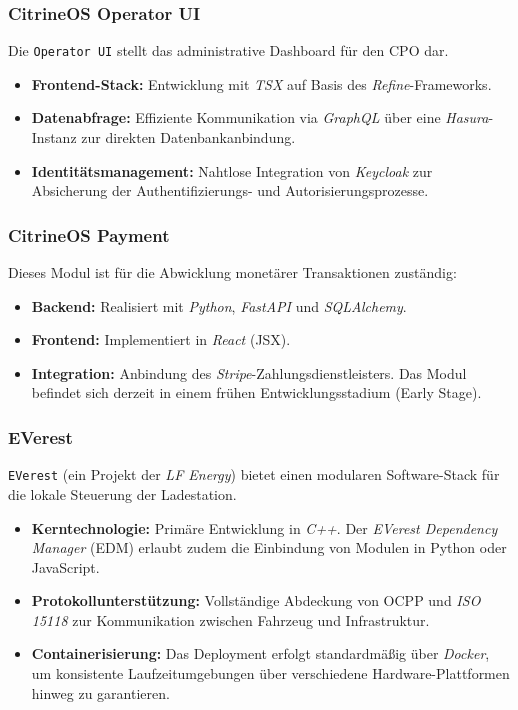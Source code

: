\documentclass[12pt,a4paper]{report}
\begin{document}
\subsubsection{CitrineOS Operator UI}
Die \texttt{Operator UI} stellt das administrative Dashboard für den \gls{CPO} dar.
\begin{itemize}
    \item \textbf{Frontend-Stack:} Entwicklung mit \textit{TSX} auf Basis des \textit{Refine}-Frameworks.
    \item \textbf{Datenabfrage:} Effiziente Kommunikation via \textit{GraphQL} über eine \textit{Hasura}-Instanz zur direkten Datenbankanbindung.
    \item \textbf{Identitätsmanagement:} Nahtlose Integration von \textit{Keycloak} zur Absicherung der Authentifizierungs- und Autorisierungsprozesse.
\end{itemize}



\subsubsection{CitrineOS Payment}
Dieses Modul ist für die Abwicklung monetärer Transaktionen zuständig:
\begin{itemize}
    \item \textbf{Backend:} Realisiert mit \textit{Python}, \textit{FastAPI} und \textit{SQLAlchemy}.
    \item \textbf{Frontend:} Implementiert in \textit{React} (JSX).
    \item \textbf{Integration:} Anbindung des \textit{Stripe}-Zahlungsdienstleisters. Das Modul befindet sich derzeit in einem frühen Entwicklungsstadium (Early Stage).
\end{itemize}

\subsubsection{EVerest}
\texttt{EVerest} (ein Projekt der \textit{LF Energy}) bietet einen modularen Software-Stack für die lokale Steuerung der Ladestation.
\begin{itemize}
    \item \textbf{Kerntechnologie:} Primäre Entwicklung in \textit{C++}. Der \textit{EVerest Dependency Manager} (EDM) erlaubt zudem die Einbindung von Modulen in Python oder JavaScript.
    \item \textbf{Protokollunterstützung:} Vollständige Abdeckung von \gls{OCPP} und \textit{ISO 15118} zur Kommunikation zwischen Fahrzeug und Infrastruktur.
    \item \textbf{Containerisierung:} Das Deployment erfolgt standardmäßig über \textit{Docker}, um konsistente Laufzeitumgebungen über verschiedene Hardware-Plattformen hinweg zu garantieren.
\end{itemize}
\end{document}
